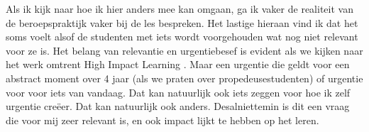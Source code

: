 Als ik kijk naar hoe ik hier anders mee kan omgaan, ga ik vaker de realiteit van de beroepspraktijk vaker bij de les bespreken. Het lastige hieraan vind ik dat het soms voelt alsof de studenten met iets wordt voorgehouden wat nog niet relevant voor ze is. Het belang van relevantie en urgentiebesef is evident als we kijken naar het werk omtrent High Impact Learning \cite{dochy2015high}. Maar een urgentie die geldt voor een abstract moment over 4 jaar (als we praten over propedeusestudenten) of urgentie voor voor iets van vandaag. Dat kan natuurlijk ook iets zeggen voor hoe ik zelf urgentie creëer. Dat kan natuurlijk ook anders. Desalniettemin is dit een vraag die voor mij zeer relevant is, en ook impact lijkt te hebben op het leren.

